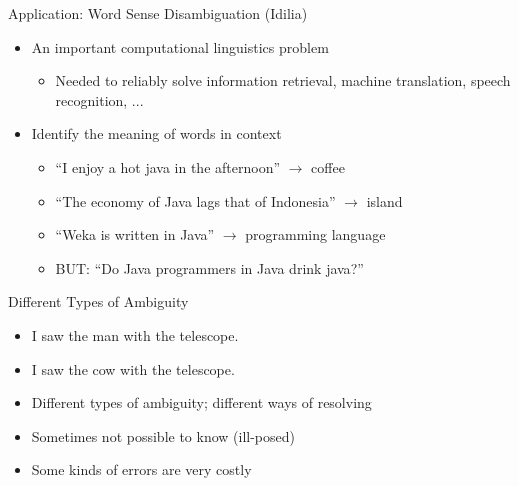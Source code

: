 \documentclass{beamer}
\begin{document}
\begin{frame}{Application: Word Sense Disambiguation (Idilia)}
  \begin{itemize}
  \item An important computational linguistics problem
    \begin{itemize}
      \item Needed to reliably solve information retrieval, machine translation, speech recognition, ...
    \end{itemize}
  \item Identify the meaning of words in context
    \begin{itemize}
      \item ``I enjoy a hot \alert{java} in the afternoon'' $\rightarrow$ \alert{coffee}
      \item ``The economy of \alert{Java} lags that of Indonesia'' $\rightarrow$ \alert{island}
      \item ``Weka is written in \alert{Java}'' $\rightarrow$ \alert{programming language}
      \item BUT: “Do \alert{Java} programmers in \alert{Java} drink \alert{java}?”
    \end{itemize}
  \end{itemize}
\end{frame}



\begin{frame}{Different Types of Ambiguity}

  \begin{itemize}
  \item I saw the man with the telescope.\\
    \hskip 0.2cm
    \hskip 0.2cm
    \hskip 0.2cm
     \pause
    
  \item I saw the cow with the telescope.\\
    \hskip 0.2cm
     \pause
  \item Different types of ambiguity; different ways of resolving
  \item Sometimes not possible to know \alert{(ill-posed)}
  \item Some kinds of errors are very costly
  \end{itemize}
  
\end{frame}
\end{document}
